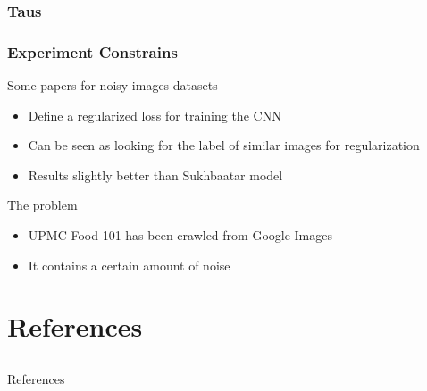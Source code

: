 \documentclass[compress,xcolor=table]{beamer}
\begin{document}
\subsubsection{Taus}
\subsubsection{Experiment Constrains}

\begin{frame}{Some papers for noisy images datasets}
	
	\begin{exampleblock}{ \cite{Azadi2015}}
		
		\begin{itemize}
			\item
			Define a regularized loss for training the CNN
			\item
			Can be seen as looking for the label of similar images for
			regularization
			\item
			Results slightly better than Sukhbaatar model
		\end{itemize}
		
	\end{exampleblock}

	\begin{alertblock}{The problem}
	
	\begin{itemize}
		\item
		UPMC Food-101 has been crawled from Google Images
		\item
		It contains a certain amount of noise
	\end{itemize}
	
	\end{alertblock}
	
\end{frame}

\section{References} \subsection{}

\begin{frame}[allowframebreaks]{References}
	
	\printbibliography[heading=none]
	
\end{frame}
\end{document}
